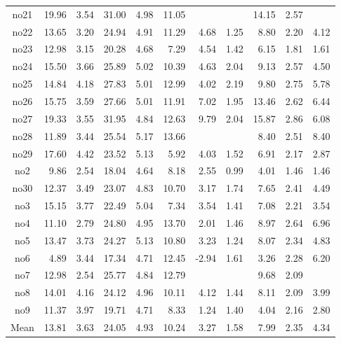 {\begin{longtable}{@{}cr@{\hspace{1em}}r@{\hspace{1em}}r@{\hspace{1em}}r@{\hspace{1em}}r@{\hspace{2em}}r@{\hspace{1em}}r@{\hspace{1em}}r@{\hspace{1em}}r@{\hspace{1em}}r@{}}
no21&19.96&3.54&31.00&4.98&11.05&&&14.15&2.57&\\
no22&13.65&3.20&24.94&4.91&11.29&4.68&1.25&8.80&2.20&4.12\\
no23&12.98&3.15&20.28&4.68&7.29&4.54&1.42&6.15&1.81&1.61\\
no24&15.50&3.66&25.89&5.02&10.39&4.63&2.04&9.13&2.57&4.50\\
no25&14.84&4.18&27.83&5.01&12.99&4.02&2.19&9.80&2.75&5.78\\
no26&15.75&3.59&27.66&5.01&11.91&7.02&1.95&13.46&2.62&6.44\\
no27&19.33&3.55&31.95&4.84&12.63&9.79&2.04&15.87&2.86&6.08\\
no28&11.89&3.44&25.54&5.17&13.66&&&8.40&2.51&8.40\\
no29&17.60&4.42&23.52&5.13&5.92&4.03&1.52&6.91&2.17&2.87\\
no2&9.86&2.54&18.04&4.64&8.18&2.55&0.99&4.01&1.46&1.46\\
no30&12.37&3.49&23.07&4.83&10.70&3.17&1.74&7.65&2.41&4.49\\
no3&15.15&3.77&22.49&5.04&7.34&3.54&1.41&7.08&2.21&3.54\\
no4&11.10&2.79&24.80&4.95&13.70&2.01&1.46&8.97&2.64&6.96\\
no5&13.47&3.73&24.27&5.13&10.80&3.23&1.24&8.07&2.34&4.83\\
no6&4.89&3.44&17.34&4.71&12.45&-2.94&1.61&3.26&2.28&6.20\\
no7&12.98&2.54&25.77&4.84&12.79&&&9.68&2.09&\\
no8&14.01&4.16&24.12&4.96&10.11&4.12&1.44&8.11&2.09&3.99\\
no9&11.37&3.97&19.71&4.71&8.33&1.24&1.40&4.04&2.16&2.80\\
\midrule
Mean&13.81&3.63&24.05&4.93&10.24&3.27&1.58&7.99&2.35&4.34\\
\bottomrule
\end{longtable}}
